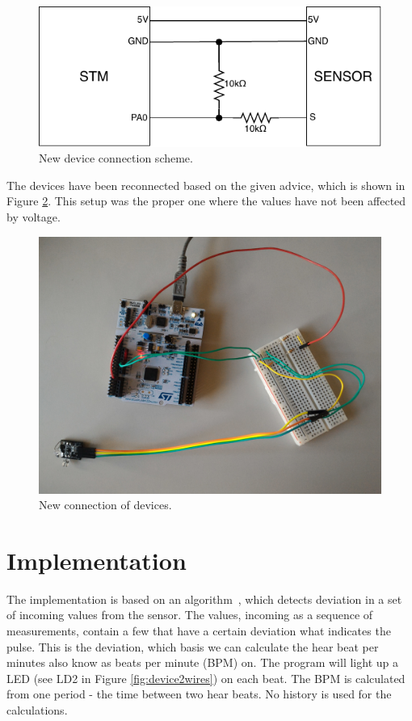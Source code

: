\documentclass[11pt,a4paper]{article}
\begin{document}
\begin{figure}[H]
    \centering
    \includegraphics[scale=1.4]{img/new_con_scheme.pdf}
    \caption{New device connection scheme.}
    \label{fig:new_con_scheme}
\end{figure}

The devices have been reconnected based on the given advice, which is shown in Figure \ref{fig:new_dev_con}. This setup was the proper one where the values have not been affected by voltage.

\begin{figure}[H]
    \centering
    \includegraphics[scale=0.1]{img/setup2.jpg}
    \caption{New connection of devices.}
    \label{fig:new_dev_con}
\end{figure}

\newpage

\section{Implementation}\label{sec:impl}

The implementation is based on an algorithm~\cite{SENSOR}, which detects deviation in a set of incoming values from the sensor. The values, incoming as a sequence of measurements, contain a few that have a certain deviation what indicates the pulse. This is the deviation, which basis we can calculate the hear beat per minutes also know as beats per minute (BPM) on. The program will light up a LED (see LD2 in Figure \ref{fig:device2wires}) on each beat. The BPM is calculated from one period - the time between two hear beats. No history is used for the calculations.\\
\end{document}
